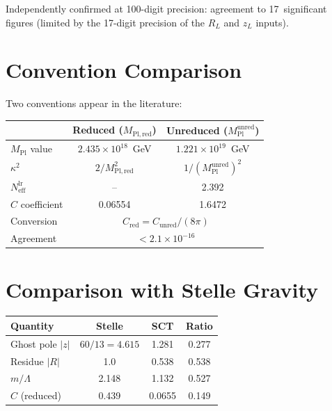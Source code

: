 \documentclass[11pt,a4paper]{article}
\newcommand{\MPl}{M_{\mathrm{Pl}}}
\newcommand{\MPlred}{M_{\mathrm{Pl,red}}}
\newcommand{\Neff}{N_{\mathrm{eff}}}
\begin{document}
\noindent
Independently confirmed at 100-digit precision: agreement to 17~significant
figures (limited by the 17-digit precision of the $R_L$ and $z_L$ inputs).


\section{Convention Comparison}
\label{sec:conventions}

Two conventions appear in the literature:

\begin{center}
\begin{tabular}{lcc}
\toprule
 & Reduced ($\MPlred$) & Unreduced ($\MPl^{\mathrm{unred}}$) \\
\midrule
$\MPl$ value & $2.435 \times 10^{18}$~GeV &
  $1.221 \times 10^{19}$~GeV \\
$\kappa^2$ & $2/\MPlred^2$ & $1/(\MPl^{\mathrm{unred}})^2$ \\
$\Neff^{\mathrm{lr}}$ & -- & 2.392 \\
$C$ coefficient & 0.06554 & 1.6472 \\
Conversion & \multicolumn{2}{c}{$C_{\mathrm{red}} =
  C_{\mathrm{unred}}/(8\pi)$} \\
Agreement & \multicolumn{2}{c}{$< 2.1 \times 10^{-16}$} \\
\bottomrule
\end{tabular}
\end{center}


\section{Comparison with Stelle Gravity}
\label{sec:stelle}

\begin{center}
\begin{tabular}{lccc}
\toprule
Quantity & Stelle & SCT & Ratio \\
\midrule
Ghost pole $|z|$ & $60/13 = 4.615$ & 1.281 & 0.277 \\
Residue $|R|$ & 1.0 & 0.538 & 0.538 \\
$m/\Lambda$ & 2.148 & 1.132 & 0.527 \\
$C$ (reduced) & 0.439 & 0.0655 & 0.149 \\
\bottomrule
\end{tabular}
\end{center}
\end{document}
